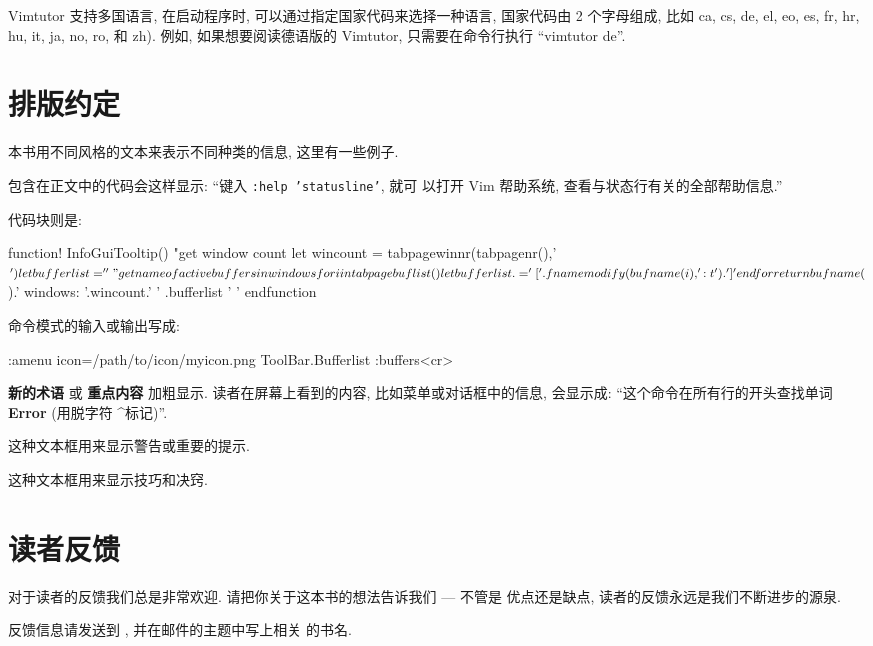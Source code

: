 Vimtutor 支持多国语言, 在启动程序时, 可以通过指定国家代码来选择一种语言, 
国家代码由 2 个字母组成, 比如 ca, cs, de, el, eo, es, fr, hr, hu, it, ja,
no, ro, 和 zh). 例如, 如果想要阅读德语版的 Vimtutor, 只需要在命令行执行
``vimtutor de''.

\section*{排版约定}
\label{sec:conventions}
本书用不同风格的文本来表示不同种类的信息, 这里有一些例子.

包含在正文中的代码会这样显示: ``键入 \texttt{:help 'statusline'}, 就可
以打开 Vim 帮助系统, 查看与状态行有关的全部帮助信息.''

代码块则是:
\begin{vimscript}
function! InfoGuiTooltip()
    "get window count
    let wincount = tabpagewinnr(tabpagenr(),'$')
    let bufferlist=''
    "get name of active buffers in windows
    for i in tabpagebuflist()
        let bufferlist .= '['.fnamemodify(bufname(i),':t').'] '
    endfor
    return bufname($).' windows: '.wincount.' ' .bufferlist ' '
endfunction
\end{vimscript}

命令模式的输入或输出写成:
\begin{vimcmd}
:amenu icon=/path/to/icon/myicon.png ToolBar.Bufferlist :buffers<cr>
\end{vimcmd}

\textbf{新的术语} 或 \textbf{重点内容} 加粗显示. 读者在屏幕上看到的内容,
比如菜单或对话框中的信息, 会显示成: ``这个命令在所有行的开头查找单词
\textbf{Error} (用脱字符 \textasciicircum 标记)''.

\begin{warning}
这种文本框用来显示警告或重要的提示.
\end{warning}

\begin{tips}
这种文本框用来显示技巧和决窍.
\end{tips}

\section*{读者反馈}
\label{sec:reader_feedback}
对于读者的反馈我们总是非常欢迎. 请把你关于这本书的想法告诉我们 --- 不管是
优点还是缺点, 读者的反馈永远是我们不断进步的源泉.

反馈信息请发送到 , 并在邮件的主题中写上相关
的书名.

